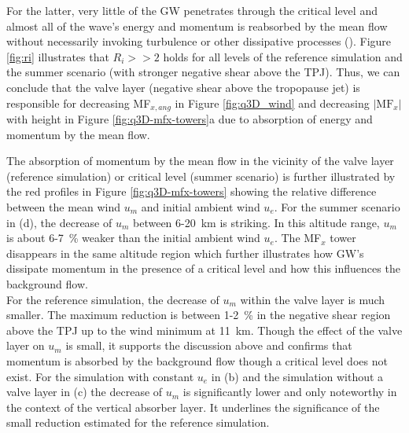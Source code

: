 For the latter, very little of the GW penetrates through the critical level and almost all of the wave's energy and momentum is reabsorbed by the mean flow without necessarily invoking turbulence or other dissipative processes (\cite[]{booker_critical_1967}). Figure \ref{fig:ri} illustrates that $R_i >> 2$ holds for all levels of the reference simulation and the summer scenario (with stronger negative shear above the TPJ). Thus, we can conclude that the valve layer (negative shear above the tropopause jet) is responsible for decreasing MF$_{x,ang}$ in Figure \ref{fig:q3D_wind} and decreasing $\lvert \mathrm{MF}_x \rvert$ with height in Figure \ref{fig:q3D-mfx-towers}a due to absorption of energy and momentum by the mean flow.

The absorption of momentum by the mean flow in the vicinity of the valve layer (reference simulation) or critical level (summer scenario) is further illustrated by the red profiles in Figure \ref{fig:q3D-mfx-towers} showing the relative difference between the mean wind $u_m$ and initial ambient wind $u_e$. For the summer scenario in (d), the decrease of $u_m$ between 6-\SI{20}{\kilo\meter} is striking. In this altitude range, $u_m$ is about 6-\SI{7}{\percent} weaker than the initial ambient wind $u_e$. The MF$_x$ tower disappears in the same altitude region which further illustrates how GW's dissipate momentum in the presence of a critical level and how this influences the background flow.\\
For the reference simulation, the decrease of $u_m$ within the valve layer is much smaller. The maximum reduction is between 1-\SI{2}{\percent} in the negative shear region above the TPJ up to the wind minimum at \SI{11}{\kilo\meter}. Though the effect of the valve layer on $u_m$ is small, it supports the discussion above and confirms that momentum is absorbed by the background flow though a critical level does not exist. For the simulation with constant $u_e$ in (b) and the simulation without a valve layer in (c) the decrease of $u_m$ is significantly lower and only noteworthy in the context of the vertical absorber layer. It underlines the significance of the small reduction estimated for the reference simulation.

